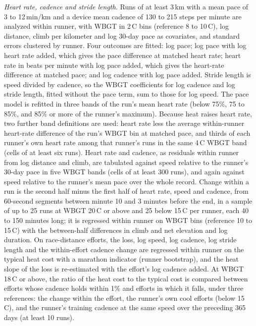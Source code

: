 \documentclass[11pt]{article}
\renewcommand{\_}{\textunderscore\allowbreak}
\begin{document}
\emph{Heart rate, cadence and stride length.} Runs of at least 3\,km with a mean pace of 3 to 12\,min/km and a device mean cadence of 130 to 215 steps per minute are analyzed within runner, with WBGT in 2\,\textdegree C bins (reference 8 to 10\,\textdegree C), log distance, climb per kilometer and log 30-day pace as covariates, and standard errors clustered by runner. Four outcomes are fitted: log pace; log pace with log heart rate added, which gives the pace difference at matched heart rate; heart rate in beats per minute with log pace added, which gives the heart-rate difference at matched pace; and log cadence with log pace added. Stride length is speed divided by cadence, so the WBGT coefficients for log cadence and log stride length, fitted without the pace term, sum to those for log speed. The pace model is refitted in three bands of the run's mean heart rate (below 75\%, 75 to 85\%, and 85\% or more of the runner's maximum). Because heat raises heart rate, two further band definitions are used: heart rate less the average within-runner heart-rate difference of the run's WBGT bin at matched pace, and thirds of each runner's own heart rate among that runner's runs in the same 4\,\textdegree C WBGT band (cells of at least six runs). Heart rate and cadence, as residuals within runner from log distance and climb, are tabulated against speed relative to the runner's 30-day pace in five WBGT bands (cells of at least 300 runs), and again against speed relative to the runner's mean pace over the whole record. Change within a run is the second half minus the first half of heart rate, speed and cadence, from 60-second segments between minute 10 and 3 minutes before the end, in a sample of up to 25 runs at WBGT 20\,\textdegree C or above and 25 below 15\,\textdegree C per runner, each 40 to 150 minutes long; it is regressed within runner on WBGT bins (reference 10 to 15\,\textdegree C) with the between-half differences in climb and net elevation and log duration. On race-distance efforts, the loss, log speed, log cadence, log stride length and the within-effort cadence change are regressed within runner on the typical heat cost with a marathon indicator (runner bootstrap), and the heat slope of the loss is re-estimated with the effort's log cadence added. At WBGT 18\,\textdegree C or above, the ratio of the heat cost to the typical cost is compared between efforts whose cadence holds within 1\% and efforts in which it falls, under three references: the change within the effort, the runner's own cool efforts (below 15\,\textdegree C), and the runner's training cadence at the same speed over the preceding 365 days (at least 10 runs).
\end{document}
